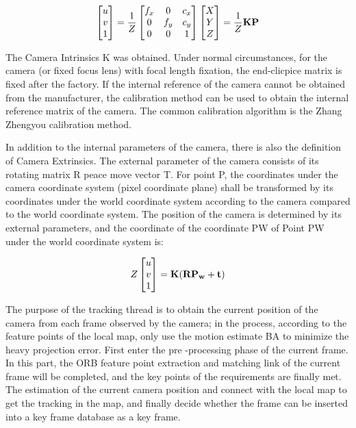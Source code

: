 \documentclass[conference]{IEEEtran}
\begin{document}
\begin{equation}
    \begin{bmatrix}
    u\\v\\1
    \end{bmatrix}=
    \frac{1}{Z}
    \begin{bmatrix}
    f_x & 0 & c_x\\
    0   & f_y & c_y\\
    0 & 0 & 1
    \end{bmatrix}
    \begin{bmatrix}
    X\\Y\\Z
    \end{bmatrix}=
    \frac{1}{Z} \bf{KP}
    \end{equation}

The Camera Intrinsics K was obtained. 
Under normal circumstances, 
for the camera (or fixed focus lens) with focal length fixation, 
the end-clicpice matrix is fixed after the factory. 
If the internal reference of the camera cannot be obtained from the manufacturer, 
the calibration method can be used to obtain the internal reference matrix of the camera. 
The common calibration algorithm is the Zhang Zhengyou calibration method.

In addition to the internal parameters of the camera, 
there is also the definition of Camera Extrinsics. 
The external parameter of the camera consists of its rotating matrix R peace move vector T. 
For point P, 
the coordinates under the camera coordinate system (pixel coordinate plane) shall be transformed 
by its coordinates under the world coordinate system according to the camera compared to the world 
coordinate system. The position of the camera is determined by its external parameters, 
and the coordinate of the coordinate PW of Point PW under the world coordinate system is:

\begin{equation}
    Z
    \begin{bmatrix}
    u\\v\\1
    \end{bmatrix}=
    \bf{K(RP_w+t)}
\end{equation}

The purpose of the tracking thread is to obtain the current position of the camera from each frame observed by the camera; 
in the process, according to the feature points of the local map, only use the motion estimate BA to minimize the heavy projection error. 
First enter the pre -processing phase of the current frame. 
In this part, the ORB feature point extraction and matching link of the current frame will be completed, 
and the key points of the requirements are finally met. 
The estimation of the current camera position and connect with the local map to get the tracking in the map, 
and finally decide whether the frame can be inserted into a key frame database as a key frame.
\end{document}
